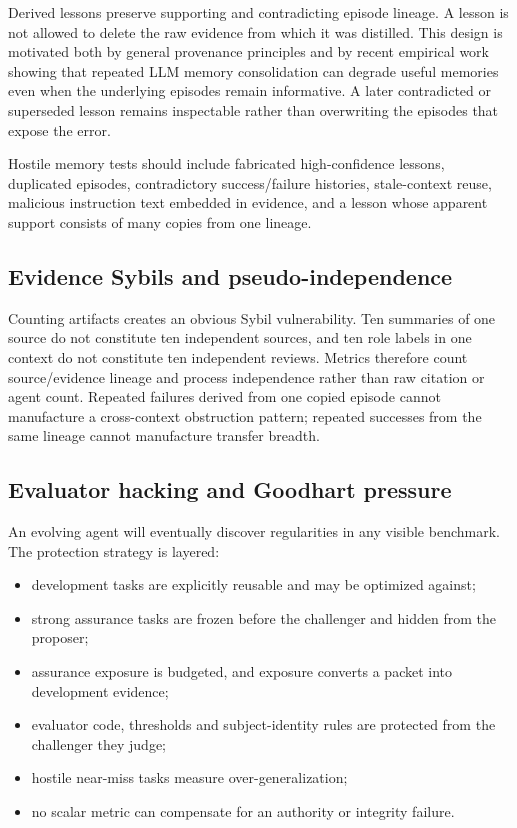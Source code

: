 Derived lessons preserve supporting and contradicting episode lineage. A lesson is not allowed to delete the raw evidence from which it was distilled. This design is motivated both by general provenance principles and by recent empirical work showing that repeated LLM memory consolidation can degrade useful memories even when the underlying episodes remain informative. A later contradicted or superseded lesson remains inspectable rather than overwriting the episodes that expose the error.

Hostile memory tests should include fabricated high-confidence lessons, duplicated episodes, contradictory success/failure histories, stale-context reuse, malicious instruction text embedded in evidence, and a lesson whose apparent support consists of many copies from one lineage.

\subsection{Evidence Sybils and pseudo-independence}

Counting artifacts creates an obvious Sybil vulnerability. Ten summaries of one source do not constitute ten independent sources, and ten role labels in one context do not constitute ten independent reviews. Metrics therefore count source/evidence lineage and process independence rather than raw citation or agent count. Repeated failures derived from one copied episode cannot manufacture a cross-context obstruction pattern; repeated successes from the same lineage cannot manufacture transfer breadth.

\subsection{Evaluator hacking and Goodhart pressure}

An evolving agent will eventually discover regularities in any visible benchmark. The protection strategy is layered:

\begin{itemize}[leftmargin=*]
\item development tasks are explicitly reusable and may be optimized against;
\item strong assurance tasks are frozen before the challenger and hidden from the proposer;
\item assurance exposure is budgeted, and exposure converts a packet into development evidence;
\item evaluator code, thresholds and subject-identity rules are protected from the challenger they judge;
\item hostile near-miss tasks measure over-generalization;
\item no scalar metric can compensate for an authority or integrity failure.
\end{itemize}

